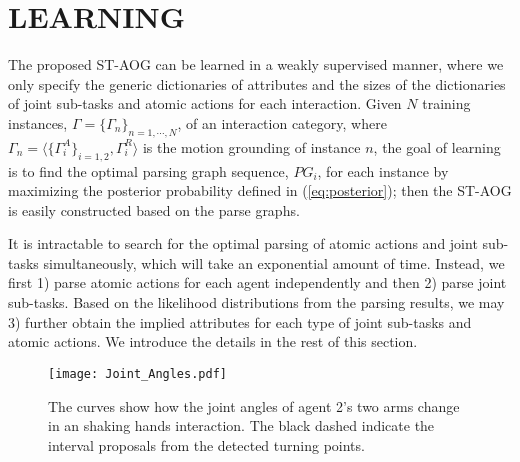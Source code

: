 \documentclass[letterpaper, 10 pt, conference]{ieeeconf}  %
\begin{document}
    

    

\section{LEARNING}

The proposed ST-AOG can be learned in a weakly supervised manner, where we only specify the generic dictionaries of attributes and the sizes of the dictionaries of joint sub-tasks and atomic actions for each interaction. Given $N$ training instances, $\Gamma = \{\Gamma_n\}_{n = 1,\cdots,N}$, of an interaction category, where $\Gamma_n = \langle\{\Gamma^A_i\}_{i=1,2}, \Gamma^R_i \rangle$ is the motion grounding of instance $n$, the goal of learning is to find the optimal parsing graph sequence, $PG_i$, for each instance by maximizing the posterior probability defined in (\ref{eq:posterior}); then the ST-AOG is easily constructed based on the parse graphs.

It is intractable to search for the optimal parsing of atomic actions and joint sub-tasks simultaneously, which will take an exponential amount of time. Instead, we first 1) parse atomic actions for each agent independently and then 2) parse joint sub-tasks. Based on the likelihood distributions from the parsing results, we may 3) further obtain the implied attributes for each type of joint sub-tasks and atomic actions. We introduce the details in the rest of this section.



\begin{figure}[t!]
    \centering
    \texttt{[image: Joint\_Angles.pdf]}
    \vspace{-5pt}
    \caption{The curves show how the joint angles of agent 2's two arms change in an shaking hands interaction. The black dashed indicate the interval proposals from the detected turning points.}
    \vspace{-5pt}
    \label{fig:atomicparsing}
\end{figure}
\end{document}
